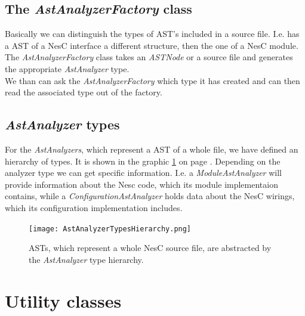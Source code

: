 \documentclass[a4paper,10pt]{report}
\begin{document}
\subsection{The {\it AstAnalyzerFactory} class}
Basically we can distinguish the types of AST's included in a source file. I.e. has a AST of a NesC interface a different structure, then the one of a NesC module.
The {\it AstAnalyzerFactory} class takes an {\it ASTNode} or a source file and generates the appropriate {\it AstAnalyzer} type.\\
We than can ask the {\it AstAnalyzerFactory} which type it has created and can then read the associated type out of the factory.

\subsection{{\it AstAnalyzer} types}
For the {\it AstAnalyzers}, which represent a AST of a whole file, we have defined an hierarchy of types. It is shown in the graphic
\ref{AstAnalyzersTypeHierarchy} on page \pageref{AstAnalyzersTypeHierarchy}. Depending on the analyzer type we can get specific information. 
I.e. a {\it ModuleAstAnalyzer} will provide information about the Nesc code, which its module implementaion contains, while a {\it ConfigurationAstAnalyzer} holds data about the NesC wirings, which its configuration implementation includes.

\begin{figure}[h]
\centering
\texttt{[image: AstAnalyzerTypesHierarchy.png]}
\caption{ASTs, which represent a whole NesC source file, are abstracted by the {\it AstAnalyzer} type hierarchy.}
\label{AstAnalyzersTypeHierarchy}
\end{figure}

\section{Utility classes}
\end{document}

